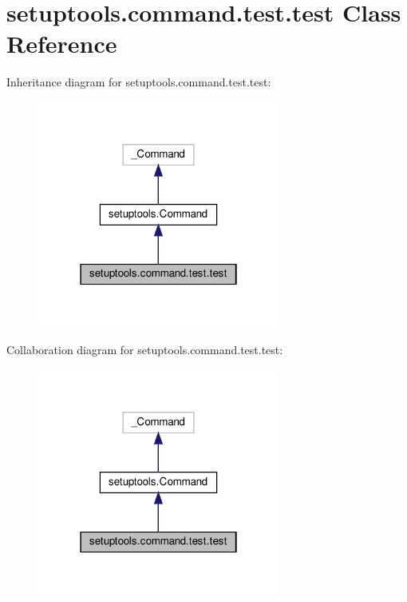 \hypertarget{classsetuptools_1_1command_1_1test_1_1test}{}\section{setuptools.\+command.\+test.\+test Class Reference}
\label{classsetuptools_1_1command_1_1test_1_1test}


Inheritance diagram for setuptools.\+command.\+test.\+test\+:
\nopagebreak
\begin{figure}[H]
\begin{center}
\leavevmode
\includegraphics[width=226pt]{classsetuptools_1_1command_1_1test_1_1test__inherit__graph}
\end{center}
\end{figure}


Collaboration diagram for setuptools.\+command.\+test.\+test\+:
\nopagebreak
\begin{figure}[H]
\begin{center}
\leavevmode
\includegraphics[width=226pt]{classsetuptools_1_1command_1_1test_1_1test__coll__graph}
\end{center}
\end{figure}
